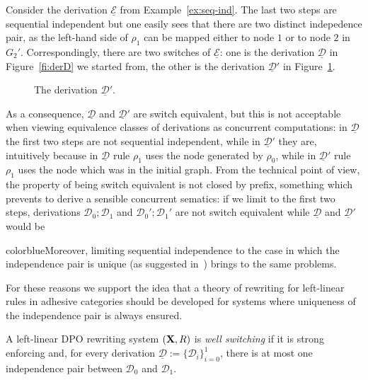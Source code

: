 \documentclass[a4paper,UKenglish,cleveref,pdftex,thm-restate,numberwithinsect,anonymous]{lipics}
\newcommand{\full}[1]{{color{blue}#1}}
\newcommand{\full}[1]{}
\def\R{\mathsf{R}}
\def\X{\textbf {\textup{X}}}
\newcommand{\dder}[1]{\mathscr{#1}}
\newcommand{\der}[1]{\underline{\dder{#1}}}
\begin{document}
\begin{example}
  Consider the derivation $\der{E}$ from Example~\ref{ex:seq-ind}.
  The last two steps are sequential independent but one easily sees
  that there are two distinct indepedence pair, as the left-hand side
  of $\rho_1$ can be mapped either to node $1$ or to node
  $2$ in $G_2'$. Correspondingly, there
  are two switches of $\der{E}$: one is the derivation $\der{D}$ in
  Figure~\ref{fi:derD} we started from, the other is the derivation
  $\der{D}'$ in Figure~\ref{fi:derD1}.
  
  \begin{figure}
    
    \caption{The derivation $\der{D}'$.}
    \label{fi:derD1}
  \end{figure}
  
  As a consequence, $\der{D}$ and $\der{D}'$ are switch equivalent, but
  this is not acceptable when viewing equivalence classes of
  derivations as concurrent computations: in $\der{D}$ the first two
  steps are not sequential independent, while in $\der{D}'$ they are,
  intuitively because in $\der{D}$ rule $\rho_1$ uses the node
  generated by $\rho_0$, while in $\der{D}'$ rule $\rho_1$ uses the
  node which was in the initial graph. From the technical point of
  view, the property of being switch equivalent is not closed by
  prefix, something which prevents to derive a sensible concurrent
  sematics: if we limit to the first two steps, derivations
  $\dder{D}_0; \dder{D}_1$ and $\dder{D}_0'; \dder{D}_1'$ are not switch
  equivalent while $\der{D}$ and $\der{D}'$ would be
\end{example} 

\full{Moreover, limiting sequential independence to the case in which the independence
pair is unique (as suggested in~\cite{baldan2017domains}) brings to the same problems.}

For these reasons we support the idea that a theory of rewriting for
left-linear rules in adhesive categories should be developed for
systems where uniqueness of the independence pair is always ensured.




\begin{definition}
A left-linear DPO rewriting system $(\X, \R)$ is \emph{well switching} if it is strong enforcing and, for every derivation $\der{D}:=\{\dder{D}_{i}\}_{i=0}^1$, there is at most one independence pair between $\dder{D}_0$ and $\dder{D}_1$.
\end{definition}
\end{document}
